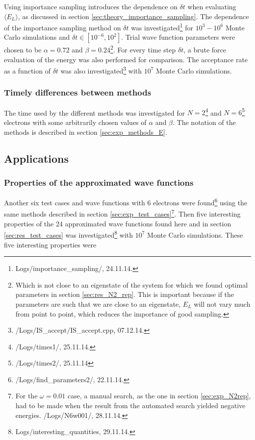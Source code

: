 Using importance sampling introduces the dependence on $\delta t$ when evaluating $\langle E_L \rangle$, as discussed in section \ref{sec:theory_importance_sampling}.
The dependence of the importance sampling method on $\delta t$ was investigated\footnote{Logs/importance\_sampling/, 24.11.14.} 
for $10^3 - 10^6$ Monte Carlo simulations and $\delta t \in [10^{-6}, 10^2]$. 
Trial wave function parameters were chosen to be $\alpha = 0.72$ and $\beta = 0.24$\footnote{Which is not close to an eigenstate of the system for which we found optimal parameters in section \ref{sec:res_N2_rep}. This is important because if the parameters are such that we are close to an eigenstate, $E_L$ will not vary much from point to point, which reduces the importance of good sampling.}.
For every time step $\delta t$, a brute force evaluation of the energy was also performed for comparison. 
The acceptance rate as a function of $\delta t$ was also investigated\footnote{/Logs/IS\_accept/IS\_accept.cpp, 07.12.14.} with $10^7$ Monte Carlo simulations.


\subsubsection{Timely differences between methods}

The time used by the different methods was investigated for $N=2$\footnote{/Logs/times1/, 25.11.14.}  and 
$N=6$\footnote{/Logs/times2/, 25.11.14} electrons with some arbitrarily chosen values of $\alpha$ and $\beta$. 
The notation of the methods is described in section \ref{sec:exp_methods_E}. 


















\subsection{Applications}

\subsubsection{Properties of the approximated wave functions}


Another six test cases and wave functions with $6$ electrons were found\footnote{/Logs/find\_parameters2/, 22.11.14.}  using the same methods described in section \ref{sec:exp_test_cases}\footnote{For the $\omega=0.01$ case, a manual search, as the one in section \ref{sec:exp_N2rep}, had to be made when the result from the automated search yielded negative energies. /Logs/N6w001/, 28.11.14.}.
Then five interesting properties of the 24 approximated wave functions found here and in section \ref{sec:res_test_cases} was investigated\footnote{Logs/interesting\_quantities, 29.11.14.} with $10^7$ Monte Carlo simulations.
These five interesting properties were

